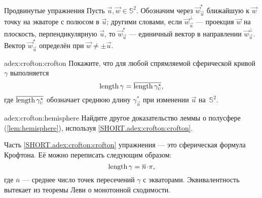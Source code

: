 \begin{thm}{Продвинутые упражнения} \label{adex:crofton}
Пусть ${\vec u},{\vec w}\in\mathbb{S}^2$.
Обозначим через ${\vec w}^*_{\vec u}$ ближайшую к ${\vec w}$ точку на экваторе с полюсом в ${\vec u}$;
другими словами, если ${\vec w}^\perp_{\vec u}$ --- проекция ${\vec w}$ на плоскость, перпендикулярную ${\vec u}$, то ${\vec w}^*_{\vec u}$ --- единичный вектор в направлении ${\vec w}^\perp_{\vec u}$.
Вектор ${\vec w}^*_{\vec u}$ определён при ${\vec w}\ne\pm {\vec u}$.

\begin{subthm}{adex:crofton:crofton}
Покажите, что для любой спрямляемой 
сферической кривой $\gamma$ выполняется
\[\mathop{\rm length}\nolimits\gamma=\overline{\mathop{\rm length}\nolimits\gamma^*_{\text{\sc{u}}}},\]
где $\overline{\mathop{\rm length}\nolimits\gamma^*_{\text{\sc{u}}}}$ обозначает среднюю длину $\gamma^*_{\vec u}$ при изменении ${\vec u}$ на~$\mathbb{S}^2$.
\end{subthm}

\begin{subthm}{adex:crofton:hemisphere}
Найдите другое доказательство леммы о полусфере (\ref{lem:hemisphere}),
используя \ref{SHORT.adex:crofton:crofton}. 
\end{subthm}
 
\end{thm}

Часть \ref{SHORT.adex:crofton:crofton} упражнения --- это сферическая формула Крофтона.
Её можно переписать следующим образом:
\[\length\gamma=\overline n\cdot \pi,\]
где $\overline n$ --- среднее число точек пересечений $\gamma$ с экваторами.
Эквивалентность вытекает из теоремы Леви о монотонной сходимости.

